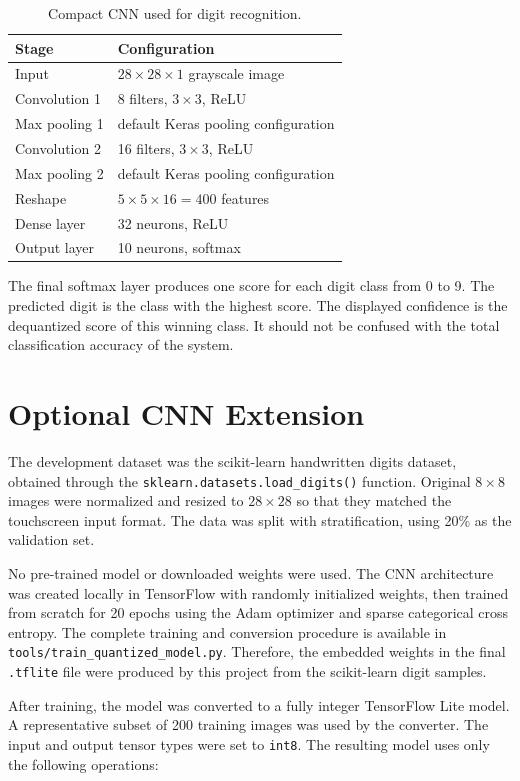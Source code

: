 \documentclass[conference]{IEEEtran}
\begin{document}
\begin{table}[ht]
\centering
\caption{Compact CNN used for digit recognition.}
\label{tab:architecture}
\begin{tabular}{ll}
\toprule
Stage & Configuration \\
\midrule
Input & $28 \times 28 \times 1$ grayscale image \\
Convolution 1 & 8 filters, $3 \times 3$, ReLU \\
Max pooling 1 & default Keras pooling configuration \\
Convolution 2 & 16 filters, $3 \times 3$, ReLU \\
Max pooling 2 & default Keras pooling configuration \\
Reshape & $5 \times 5 \times 16 = 400$ features \\
Dense layer & 32 neurons, ReLU \\
Output layer & 10 neurons, softmax \\
\bottomrule
\end{tabular}
\end{table}

The final softmax layer produces one score for each digit class from 0 to 9. The predicted digit is the class with the highest score. The displayed confidence is the dequantized score of this winning class. It should not be confused with the total classification accuracy of the system.

\section{Optional CNN Extension}
The development dataset was the scikit-learn handwritten digits dataset, obtained through the \texttt{sklearn.datasets.load\_digits()} function. Original $8 \times 8$ images were normalized and resized to $28 \times 28$ so that they matched the touchscreen input format. The data was split with stratification, using 20\% as the validation set.

No pre-trained model or downloaded weights were used. The CNN architecture was created locally in TensorFlow with randomly initialized weights, then trained from scratch for 20 epochs using the Adam optimizer and sparse categorical cross entropy. The complete training and conversion procedure is available in \texttt{tools/train\_quantized\_model.py}. Therefore, the embedded weights in the final \texttt{.tflite} file were produced by this project from the scikit-learn digit samples.

After training, the model was converted to a fully integer TensorFlow Lite model. A representative subset of 200 training images was used by the converter. The input and output tensor types were set to \texttt{int8}. The resulting model uses only the following operations:
\end{document}
